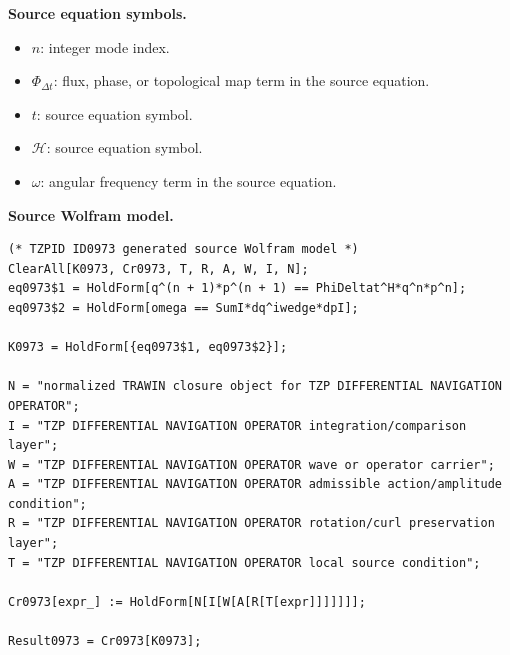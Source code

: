 \begin{minipage}[t]{0.49\linewidth}
\begingroup
\small
\raggedright
\textbf{Source equation symbols.}\par
\begin{itemize}[leftmargin=1.35em,itemsep=1pt,topsep=1pt,parsep=0pt]
    \item $n$: integer mode index.
    \item $\Phi_{\Delta t}$: flux, phase, or topological map term in the source equation.
    \item $t$: source equation symbol.
    \item $\mathcal{H}$: source equation symbol.
    \item $\omega$: angular frequency term in the source equation.
\end{itemize}
\endgroup
\end{minipage}\hfill
\begin{minipage}[t]{0.47\linewidth}
\begingroup
\scriptsize
\raggedright
\textbf{Source Wolfram model.}\par
\begin{Verbatim}[fontsize=\tiny,breaklines=true,breakanywhere=true]
(* TZPID ID0973 generated source Wolfram model *)
ClearAll[K0973, Cr0973, T, R, A, W, I, N];
eq0973$1 = HoldForm[q^(n + 1)*p^(n + 1) == PhiDeltat^H*q^n*p^n];
eq0973$2 = HoldForm[omega == SumI*dq^iwedge*dpI];

K0973 = HoldForm[{eq0973$1, eq0973$2}];

N = "normalized TRAWIN closure object for TZP DIFFERENTIAL NAVIGATION OPERATOR";
I = "TZP DIFFERENTIAL NAVIGATION OPERATOR integration/comparison layer";
W = "TZP DIFFERENTIAL NAVIGATION OPERATOR wave or operator carrier";
A = "TZP DIFFERENTIAL NAVIGATION OPERATOR admissible action/amplitude condition";
R = "TZP DIFFERENTIAL NAVIGATION OPERATOR rotation/curl preservation layer";
T = "TZP DIFFERENTIAL NAVIGATION OPERATOR local source condition";

Cr0973[expr_] := HoldForm[N[I[W[A[R[T[expr]]]]]]];

Result0973 = Cr0973[K0973];
\end{Verbatim}
\endgroup
\end{minipage}

